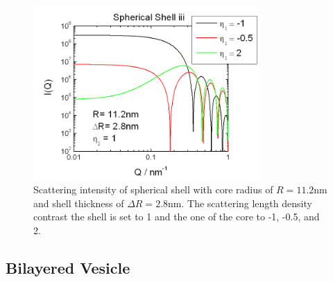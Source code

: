 \begin{figure}[htb]
\begin{center}
\includegraphics[width=0.768\textwidth]{../images/form_factor/spheres/shell_iii_P.png}
\end{center}
\caption{Scattering intensity of spherical shell with core radius of $R=11.2$nm
and shell thickness of $\Delta R=2.8$nm. The scattering length density contrast the shell is set to 1
and the one of the core to -1, -0.5, and 2.} \label{fig:I_shell_iii}
\end{figure}
\clearpage



\clearpage
\subsection{Bilayered Vesicle}
\label{sect:BilayeredVesicle} ~\\

